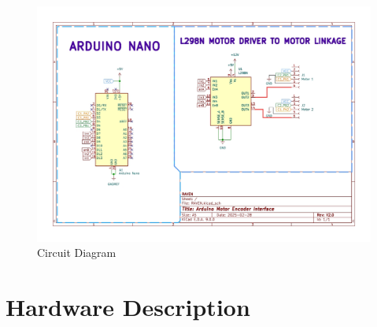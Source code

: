 {\begin{enumerate}[label=\textbf{\arabic*}.]
	\end{enumerate}
	
	\begin{figure}[H]
		\centering
		\includegraphics[scale=0.7]{main_pages/RAVEN_page-0001}
		\caption{Circuit Diagram}
		\label{fig:Circuit}
	\end{figure}
}

\section{\fontsize{14}{16} Hardware Description}
